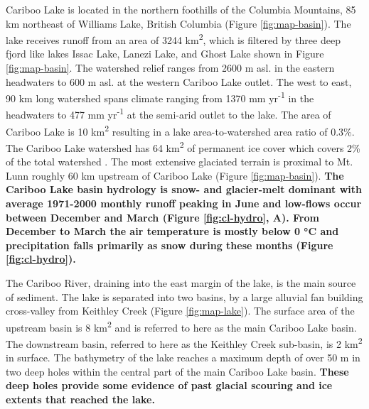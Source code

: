 \documentclass[Royal,times,doublespace,sageh]{sagej}
\begin{document}
Cariboo Lake is located in the northern foothills of the Columbia
Mountains, 85 km northeast of Williams Lake, British Columbia (Figure
\ref{fig:map-basin}). The lake receives runoff from an area of 3244
km\textsuperscript{2}, which is filtered by three deep fjord like lakes
Issac Lake, Lanezi Lake, and Ghost Lake shown in Figure
\ref{fig:map-basin}. The watershed relief ranges from 2600 m asl. in the
eastern headwaters to 600 m asl. at the western Cariboo Lake outlet. The
west to east, 90 km long watershed spans climate ranging from 1370 mm
yr\textsuperscript{-1} in the headwaters to 477 mm
yr\textsuperscript{-1} at the semi-arid outlet to the lake. The area of
Cariboo Lake is 10 km\textsuperscript{2} resulting in a lake
area-to-watershed area ratio of 0.3\%. The Cariboo Lake watershed has 64
km\textsuperscript{2} of permanent ice cover which covers 2\% of the
total watershed \citep{Bolch2008}. The most extensive glaciated terrain
is proximal to Mt. Lunn roughly 60 km upstream of Cariboo Lake (Figure
\ref{fig:map-basin}). \textbf{The Cariboo Lake basin hydrology is snow-
and glacier-melt dominant with average 1971-2000 monthly runoff peaking
in June and low-flows occur between December and March (Figure
\ref{fig:cl-hydro}, A). From December to March the air temperature is
mostly below 0 °C and precipitation falls primarily as snow during these
months (Figure \ref{fig:cl-hydro}).}

The Cariboo River, draining into the east margin of the lake, is the
main source of sediment. The lake is separated into two basins, by a
large alluvial fan building cross-valley from Keithley Creek (Figure
\ref{fig:map-lake}). The surface area of the upstream basin is 8
km\textsuperscript{2} and is referred to here as the main Cariboo Lake
basin. The downstream basin, referred to here as the Keithley Creek
sub-basin, is 2 km\textsuperscript{2} in surface. The bathymetry of the
lake reaches a maximum depth of over 50 m in two deep holes within the
central part of the main Cariboo Lake basin. \textbf{These deep holes
provide some evidence of past glacial scouring and ice extents that
reached the lake.}
\end{document}
